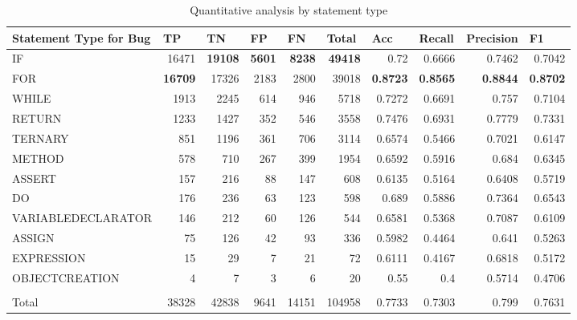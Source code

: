 \begin{appendices}
\begin{table*}[htbp]
\begin{tabular}{|l|r|r|r|r|r|r|r|r|r|}
\hline
\textbf{Statement Type for Bug} & \multicolumn{1}{l|}{\textbf{TP}} & \multicolumn{1}{l|}{\textbf{TN}} & \multicolumn{1}{l|}{\textbf{FP}} & \multicolumn{1}{l|}{\textbf{FN}} & \multicolumn{1}{l|}{\textbf{Total}} & \multicolumn{1}{l|}{\textbf{Acc}} & \multicolumn{1}{l|}{\textbf{Recall}} & \multicolumn{1}{l|}{\textbf{Precision}} & \multicolumn{1}{l|}{\textbf{F1}} \\ \hline
IF & 16471 & \textbf{19108} & \textbf{5601} & \textbf{8238} & \textbf{49418} & 0.72 & 0.6666 & 0.7462 & 0.7042 \\ \hline
FOR & \textbf{16709} & 17326 & 2183 & 2800 & 39018 & \textbf{0.8723} & \textbf{0.8565} & \textbf{0.8844} & \textbf{0.8702} \\ \hline
WHILE & 1913 & 2245 & 614 & 946 & 5718 & 0.7272 & 0.6691 & 0.757 & 0.7104 \\ \hline
RETURN & 1233 & 1427 & 352 & 546 & 3558 & 0.7476 & 0.6931 & 0.7779 & 0.7331 \\ \hline
TERNARY & 851 & 1196 & 361 & 706 & 3114 & 0.6574 & 0.5466 & 0.7021 & 0.6147 \\ \hline
METHOD & 578 & 710 & 267 & 399 & 1954 & 0.6592 & 0.5916 & 0.684 & 0.6345 \\ \hline
ASSERT & 157 & 216 & 88 & 147 & 608 & 0.6135 & 0.5164 & 0.6408 & 0.5719 \\ \hline
DO & 176 & 236 & 63 & 123 & 598 & 0.689 & 0.5886 & 0.7364 & 0.6543 \\ \hline
VARIABLEDECLARATOR & 146 & 212 & 60 & 126 & 544 & 0.6581 & 0.5368 & 0.7087 & 0.6109 \\ \hline
ASSIGN & 75 & 126 & 42 & 93 & 336 & 0.5982 & 0.4464 & 0.641 & 0.5263 \\ \hline
EXPRESSION & 15 & 29 & 7 & 21 & 72 & 0.6111 & 0.4167 & 0.6818 & 0.5172 \\ \hline
OBJECTCREATION & 4 & 7 & 3 & 6 & 20 & 0.55 & 0.4 & 0.5714 & 0.4706 \\ \hline
 & \multicolumn{1}{l|}{} & \multicolumn{1}{l|}{} & \multicolumn{1}{l|}{} & \multicolumn{1}{l|}{} & \multicolumn{1}{l|}{} & \multicolumn{1}{l|}{} & \multicolumn{1}{l|}{} & \multicolumn{1}{l|}{} & \multicolumn{1}{l|}{} \\ \hline
Total  & 38328 & 42838 & 9641 & 14151 & 104958 & 0.7733 & 0.7303 & 0.799 & 0.7631 \\ \hline
\end{tabular}
\caption{Quantitative analysis by statement type}
\label{tab:quantitative_evaluation_bug_types}
\end{table*}




\end{appendices}

